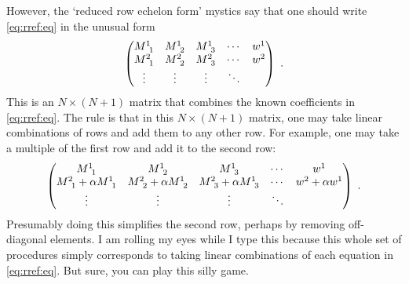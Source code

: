 \documentclass[12pt, oneside]{report}    %
\begin{document}
However, the `reduced row echelon form' mystics say that one should write \eqref{eq:rref:eq} in the unusual form
\begin{align}
    \begin{pmatrix}
        M\aij{1}{1} & 
        M\aij{1}{2} & 
        M\aij{1}{3} & 
        \cdots &
        w^1
        \\
        M\aij{2}{1} & 
        M\aij{2}{2} & 
        M\aij{2}{3} & 
        \cdots &
        w^2
        \\
        \vdots &
        \vdots &
        \vdots &
        \ddots 
    \end{pmatrix} \ .
\end{align}
This is an $N\times (N+1)$ matrix that combines the known coefficients in \eqref{eq:rref:eq}. The rule is that in this $N\times (N+1)$ matrix, one may take linear combinations of rows and add them to any other row. For example, one may take a multiple of the first row and add it to the second row:
\begin{align}
    \begin{pmatrix}
        M\aij{1}{1} & 
        M\aij{1}{2} & 
        M\aij{1}{3} & 
        \cdots &
        w^1
        \\
        M\aij{2}{1} + \alpha M\aij{1}{1}  & 
        M\aij{2}{2} + \alpha M\aij{1}{2}  & 
        M\aij{2}{3} + \alpha M\aij{1}{3}  & 
        \cdots &
        w^2 + \alpha w^1
        \\
        \vdots &
        \vdots &
        \vdots &
        \ddots 
    \end{pmatrix} \ .
\end{align}
Presumably doing this simplifies the second row, perhaps by removing off-diagonal elements. I am rolling my eyes while I type this because this whole set of procedures simply corresponds to taking linear combinations of each equation in \eqref{eq:rref:eq}. But sure, you can play this silly game.
\end{document}
